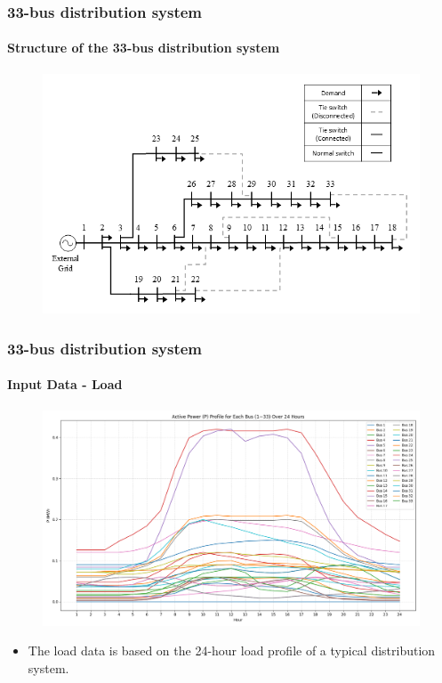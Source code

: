 \documentclass[
	11pt, %
	aspectratio=169, %
]{beamer}
\begin{document}
\begin{frame}
	\frametitle{33-bus distribution system}
	\framesubtitle{Structure of the 33-bus distribution system}

	\begin{figure}
		\includegraphics[width=4 in,keepaspectratio]{modified_33_bus_disc.png}
	\end{figure}

	
\end{frame}



\begin{frame}
	\frametitle{33-bus distribution system}
	\framesubtitle{Input Data - Load}

	\begin{figure}
		\includegraphics[width=3 in,keepaspectratio]{../fig/Load_P.png}
	\end{figure}

	\begin{itemize}
		\item The load data is based on the 24-hour load profile of a typical distribution system.
	\end{itemize}

	
\end{frame}

\end{document}
